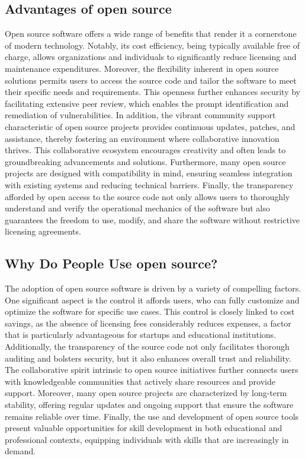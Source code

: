 \cite{opensource_what_is}

\subsection{Advantages of open source}

Open source software offers a wide range of benefits that render it a cornerstone of modern technology. 
Notably, its cost efficiency, being typically available free of charge, allows organizations and individuals to significantly reduce licensing and maintenance expenditures. 
Moreover, the flexibility inherent in open source solutions permits users to access the source code and tailor the software to meet their specific needs and requirements. 
This openness further enhances security by facilitating extensive peer review, which enables the prompt identification and remediation of vulnerabilities. 
In addition, the vibrant community support characteristic of open source projects provides continuous updates, patches, and assistance, 
thereby fostering an environment where collaborative innovation thrives. This collaborative ecosystem encourages creativity and often leads to groundbreaking advancements 
and solutions. Furthermore, many open source projects are designed with compatibility in mind, ensuring seamless integration with existing systems and reducing technical 
barriers. Finally, the transparency afforded by open access to the source code not only allows users to thoroughly understand and verify the operational mechanics of the 
software but also guarantees the freedom to use, modify, and share the software without restrictive licensing agreements.

\cite{advantages-of-open-source-software}
\cite{Pros-and-cons-of-open-source-software}

\subsection{Why Do People Use open source?}

The adoption of open source software is driven by a variety of compelling factors. 
One significant aspect is the control it affords users, who can fully customize and optimize the software for specific use cases. 
This control is closely linked to cost savings, as the absence of licensing fees considerably reduces expenses, a factor that is particularly advantageous for 
startups and educational institutions. Additionally, the transparency of the source code not only facilitates thorough auditing and bolsters security, 
but it also enhances overall trust and reliability. The collaborative spirit intrinsic to open source initiatives further connects users with knowledgeable 
communities that actively share resources and provide support. Moreover, many open source projects are characterized by long-term stability, 
offering regular updates and ongoing support that ensure the software remains reliable over time. Finally, 
the use and development of open source tools present valuable opportunities for skill development in both educational and professional contexts, 
equipping individuals with skills that are increasingly in demand.


